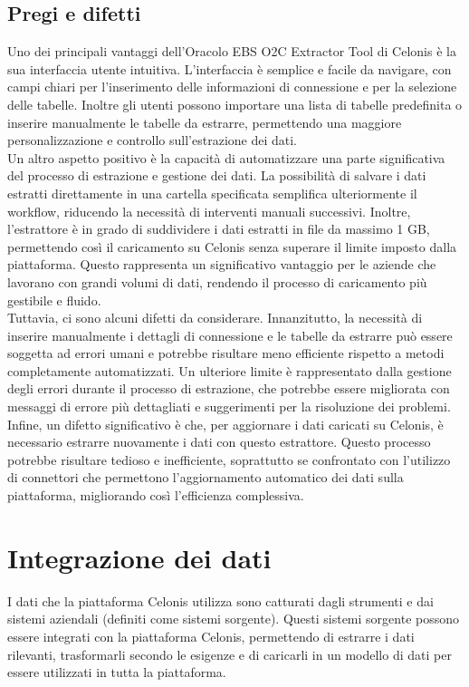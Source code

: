 \documentclass{article}
\begin{document}
\subsection{Pregi e difetti}
Uno dei principali vantaggi dell'Oracolo EBS O2C Extractor Tool di Celonis è la sua interfaccia utente intuitiva. L'interfaccia è semplice e facile da navigare, con campi chiari per l'inserimento delle informazioni di connessione e per la selezione delle tabelle. Inoltre gli utenti possono importare una lista di tabelle predefinita o inserire manualmente le tabelle da estrarre, permettendo una maggiore personalizzazione e controllo sull'estrazione dei dati.\\
Un altro aspetto positivo è la capacità di automatizzare una parte significativa del processo di estrazione e gestione dei dati. La possibilità di salvare i dati estratti direttamente in una cartella specificata semplifica ulteriormente il workflow, riducendo la necessità di interventi manuali successivi. Inoltre, l'estrattore è in grado di suddividere i dati estratti in file da massimo 1 GB, permettendo così il caricamento su Celonis senza superare il limite imposto dalla piattaforma. Questo rappresenta un significativo vantaggio per le aziende che lavorano con grandi volumi di dati, rendendo il processo di caricamento più gestibile e fluido.\\
Tuttavia, ci sono alcuni difetti da considerare. Innanzitutto, la necessità di inserire manualmente i dettagli di connessione e le tabelle da estrarre può essere soggetta ad errori umani e potrebbe risultare meno efficiente rispetto a metodi completamente automatizzati. Un ulteriore limite è rappresentato dalla gestione degli errori durante il processo di estrazione, che potrebbe essere migliorata con messaggi di errore più dettagliati e suggerimenti per la risoluzione dei problemi.\\
Infine, un difetto significativo è che, per aggiornare i dati caricati su Celonis, è necessario estrarre nuovamente i dati con questo estrattore. Questo processo potrebbe risultare tedioso e inefficiente, soprattutto se confrontato con l'utilizzo di connettori che permettono l'aggiornamento automatico dei dati sulla piattaforma, migliorando così l'efficienza complessiva.

\section{Integrazione dei dati}
I dati che la piattaforma Celonis utilizza sono catturati dagli strumenti e dai sistemi aziendali (definiti come sistemi sorgente). Questi sistemi sorgente possono essere integrati con la piattaforma Celonis, permettendo di estrarre i dati rilevanti, trasformarli secondo le esigenze e di caricarli in un modello di dati per essere utilizzati in tutta la piattaforma.
\end{document}
